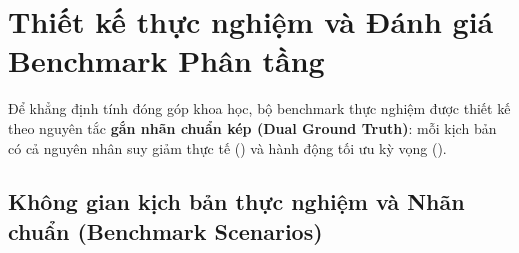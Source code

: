 \section{Thiết kế thực nghiệm và Đánh giá Benchmark Phân tầng}

Để khẳng định tính đóng góp khoa học, bộ benchmark thực nghiệm được thiết kế theo nguyên tắc \textbf{gắn nhãn chuẩn kép (Dual Ground Truth)}: mỗi kịch bản có cả nguyên nhân suy giảm thực tế () và hành động tối ưu kỳ vọng ().

\subsection{Không gian kịch bản thực nghiệm và Nhãn chuẩn (Benchmark Scenarios)}

